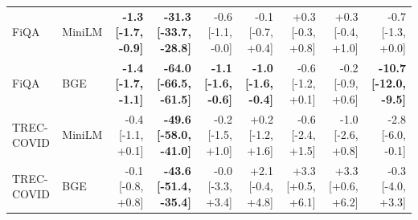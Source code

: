 \begin{table}[t]
\begin{tabular}{llrrrrrrr}
FiQA & MiniLM & \textbf{-1.3 [-1.7, -0.9]} & \textbf{-31.3 [-33.7, -28.8]} & -0.6 [-1.1, -0.0] & -0.1 [-0.7, +0.4] & +0.3 [-0.3, +0.8] & +0.3 [-0.4, +1.0] & -0.7 [-1.3, +0.0] \\
FiQA & BGE & \textbf{-1.4 [-1.7, -1.1]} & \textbf{-64.0 [-66.5, -61.5]} & \textbf{-1.1 [-1.6, -0.6]} & \textbf{-1.0 [-1.6, -0.4]} & -0.6 [-1.2, +0.1] & -0.2 [-0.9, +0.6] & \textbf{-10.7 [-12.0, -9.5]} \\
TREC-COVID & MiniLM & -0.4 [-1.1, +0.1] & \textbf{-49.6 [-58.0, -41.0]} & -0.2 [-1.5, +1.0] & +0.2 [-1.2, +1.6] & -0.6 [-2.4, +1.5] & -1.0 [-2.6, +0.8] & -2.8 [-6.0, -0.1] \\
TREC-COVID & BGE & -0.1 [-0.8, +0.8] & \textbf{-43.6 [-51.4, -35.4]} & -0.0 [-3.3, +3.4] & +2.1 [-0.4, +4.8] & +3.3 [+0.5, +6.1] & +3.3 [+0.6, +6.2] & -0.3 [-4.0, +3.3] \\
\bottomrule
\end{tabular}
\end{table}
